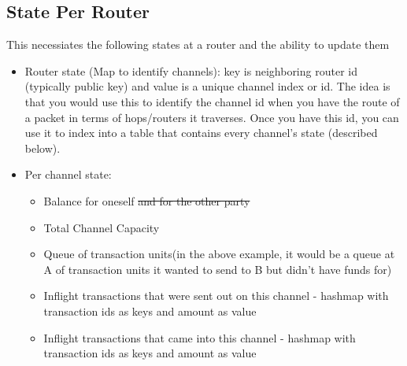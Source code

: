 \documentclass[a4paper]{article}
\newcommand{\TUs}{transaction units\xspace}
\begin{document}
\subsection{State Per Router}
This necessiates the following states at a router and the ability to update them
\begin{itemize}
    \item Router state (Map to identify channels): key is neighboring router id (typically public key) and value is a unique channel index or id. 
        The idea is that you would use this to identify the channel id when you have the route of a packet in terms of hops/routers it traverses. Once you have this id,
        you can use it to index into a table that contains every channel's state (described below).
    \item Per channel state:
        \begin{itemize}
            \item Balance for oneself \sout{and for the other party}
            \item Total Channel Capacity
            \item Queue of \TUs (in the above example, it would be a queue at A of \TUs it wanted to send to B but didn't have funds for)
            \item Inflight transactions that were sent out on this channel - hashmap with transaction ids as keys and amount as value
            \item Inflight transactions that came into this channel - hashmap with transaction ids as keys and amount as value
        \end{itemize}
\end{itemize}
\end{document}

